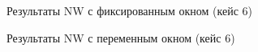 \begin{table}[H]
    \centering
    \caption{Результаты NW с фиксированным окном (кейс 6)}
    
\end{table}
\begin{table}[H]
    \centering
    \caption{Результаты NW с переменным окном (кейс 6)}
    
\end{table}
